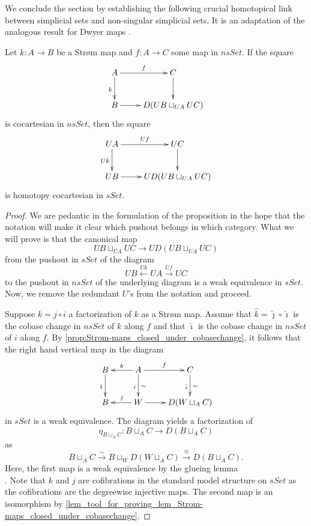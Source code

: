 We conclude the section by establishing the following crucial homotopical link between simplicial sets and non-singular simplicial sets. It is an adaptation of the analogous result for Dwyer maps \cite[Prop.~4.3]{Th80}.
\begin{lemma}\label{lem:Pushout_along_strom_homotopically_wellbehaved}
Let $k:A\rightarrow B$ be a Str\o m map and $f:A\rightarrow C$ some map in $nsSet$. If the square
\begin{displaymath}
\xymatrix{
A \ar[d]_k \ar[r]^f & C \ar[d] \\
B \ar[r] & D(UB\sqcup _{UA}UC)
}
\end{displaymath}
is cocartesian in $nsSet$, then the square
\begin{displaymath}
\xymatrix{
UA \ar[d]_{Uk} \ar[r]^{Uf} & UC \ar[d] \\
UB \ar[r] & UD(UB\sqcup _{UA}UC)
}
\end{displaymath}
is homotopy cocartesian in $sSet$.
\end{lemma}
\begin{proof}
We are pedantic in the formulation of the proposition in the hope that the notation will make it clear which pushout belongs in which category. What we will prove is that the canonical map
\[UB\sqcup _{UA}UC\to UD(UB\sqcup _{UA}UC)\]
from the pushout in $sSet$ of the diagram
\[UB\xleftarrow{Uk} UA\xrightarrow{Uf} UC\]
to the pushout in $nsSet$ of the underlying diagram is a weak equivalence in $sSet$. Now, we remove the redundant $U$'s from the notation and proceed.

Suppose $k=j\circ i$ a factorization of $k$ as a Str\o m map. Assume that $\hat{k} =\hat{\jmath } \circ \hat{\imath }$ is the cobase change in $nsSet$ of $k$ along $f$ and that $\hat{\imath }$ is the cobase change in $nsSet$ of $i$ along $f$. By \cref{prop:Strom-maps_closed_under_cobasechange}, it follows that the right hand vertical map in the diagram
\begin{displaymath}
\xymatrix{
	B \ar[d]_1 & A \ar[l]_k \ar[d]_i^\sim \ar[r]^f & C \ar[d]_{\hat{i} }^\sim \\
	B & W \ar[l]_j \ar[r] & D(W\sqcup _AC)
}
\end{displaymath}
in $sSet$ is a weak equivalence. The diagram yields a factorization of
\[\eta _{B\sqcup _AC}:B\sqcup _AC\to D(B\sqcup _AC)\]
as
\[B\sqcup _AC\xrightarrow{\sim } B\sqcup _WD(W\sqcup _AC)\xrightarrow{\cong } D(B\sqcup _AC).\]
Here, the first map is a weak equivalence by the glueing lemma\\ \cite[Prop.~13.3.9, p.~246]{Hi03}. Note that $k$ and $j$ are cofibrations in the standard model structure on $sSet$ as the cofibrations are the degreewise injective maps. The second map is an isomorphism by \cref{lem_tool_for_proving_lem_Strom-maps_closed_under_cobasechange}.
\end{proof}




